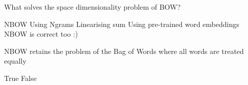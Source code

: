 \documentclass[theme=sleek, randomorder, hidesidemenu]{webquiz}
\begin{document}
\begin{question}

  What solves the space dimensionality problem of BOW?

  \begin{choice}[columns=2, multiple]
    \correct NBOW
    \incorrect Using Ngrams
    \incorrect Linearising sum
    \correct Using pre-trained word embeddings \feedback NBOW is correct too :)
  \end{choice}

\end{question}

\begin{question}

  NBOW retains the problem of the Bag of Words where all words are treated equally

  \begin{choice}[columns=2, multiple]
    \incorrect True
    \correct False
  \end{choice}

\end{question}


\end{document}
